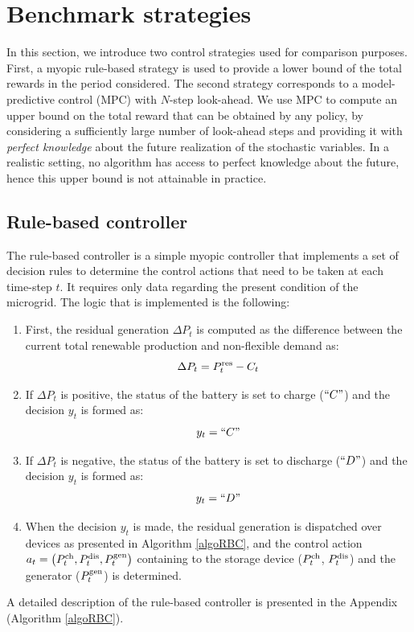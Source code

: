 \documentclass{article}
\begin{document}
\section{Benchmark strategies} \label{sec: Bechmarks}

In this section, we introduce two control strategies used for comparison purposes. First, a myopic rule-based strategy is used to provide a lower bound of the total rewards in the period considered. The second strategy corresponds to a model-predictive control (MPC) with $N$-step look-ahead. We use MPC to compute an upper bound on the total reward that can be obtained by any policy, by considering a sufficiently large number of look-ahead steps and providing it with {\em perfect knowledge} about the future realization of the stochastic variables. In a realistic setting, no algorithm has access to perfect knowledge about the future, hence this upper bound is not attainable in practice.

\subsection{Rule-based controller}
The rule-based controller is a simple myopic controller that implements a set of decision rules to determine the control actions that need to be taken at each time-step $t$. It requires only data regarding the present condition of the microgrid. The logic that is implemented is the following:
\begin{enumerate}
	\item First, the residual generation $\Delta P_t$ is computed as the difference between the current total renewable production and non-flexible demand as: $$\Delta P_t = P^\text{res}_t - C_{t}$$
	\item If $\Delta P_t$ is positive, the status of the battery is set to charge ($``C"$) and the decision $y_t$ is formed as:$$y_t = ``C"$$
	\item If $\Delta P_t$ is negative, the status of the battery is set to discharge ($``D"$) and the decision $y_t$ is formed as:$$y_t = ``D"$$
	\item When the decision $y_t$ is made, the residual generation is dispatched over devices as presented in Algorithm \ref{algoRBC}, and the control action $a_t= \left(P^{\text{ch}}_{t}, P^{\text{dis}}_{t}, P^\text{gen}_{t} \right)$ containing to the storage device ($P^{\text{ch}}_{t}$, $P^{\text{dis}}_{t}$) and the generator ($P^\text{gen}_{t}$) is determined. 
	
\end{enumerate}
A detailed description of the rule-based controller is presented in the Appendix (Algorithm \ref{algoRBC}).
\end{document}
